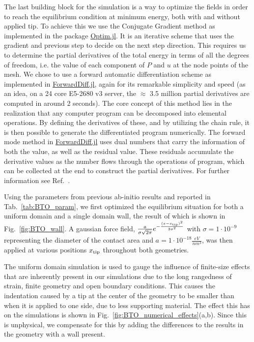 The last building block for the simulation is a way to optimize the fields in order to reach the equilibrium condition at minimum energy, both with and without applied tip.
To achieve this we use the Conjugate Gradient method \cite{Hestenes1952,Hager2005} as implemented in the package \href{https://github.com/JuliaNLSolvers/Optim.jl}{Optim.jl}.
It is an iterative scheme that uses the gradient and previous step to decide on the next step direction. 
This requires us to determine the partial derivatives of the total energy in terms of all the degrees of freedom, i.e. the value of each component of $P$ and $u$ at the node points of the mesh.
We chose to use a forward automatic differentiation scheme as implemented in \href{www.juliadiff.org/ForwardDiff.jl/latest/}{ForwardDiff.jl}, again for its remarkable simplicity and speed (as an idea, on a 24 core E5-2680 v3 server, the $\approx$ 3.5 million partial derivatives are computed in around 2 seconds).
The core concept of this method lies in the realization that any computer program can be decomposed into elemental operations. By defining the derivatives of these, and by utilizing the chain rule, it is then possible to generate the differentiated program numerically.
The forward mode method in \href{www.juliadiff.org/ForwardDiff.jl/latest/}{ForwardDiff.jl} uses dual numbers that carry the information of both the value, as well as the residual value. These residuals accumulate the derivative values as the number flows through the operations of program, which can be collected at the end to construct the partial derivatives.
For further information see Ref.~\cite{Hoffmann2016}.

Using the parameters from previous ab-initio results \cite{Marton2010} and reported in Tab.~\ref{tab:BTO_param}, we first optimized the equilibrium situation for both a uniform domain and a single domain wall, the result of which is shown in Fig.~\ref{fig:BTO_wall}.
A gaussian force field, $\frac{a}{\sigma \sqrt{2\pi}}e^{-\frac{(x-x_{\rm tip})^2}{2\sigma^2}}$ with $\sigma = 1 \cdot 10^{-9}$ representing the diameter of the contact area and $a = 1 \cdot 10^{-18} \frac{eV}{nm^3}$, was then applied at various positions $x_{\rm tip}$ throughout both geometries.

The uniform domain simulation is used to gauge the influence of finite-size effects that are inherently present in our simulations due to the long rangedness of strain, finite geometry and open boundary conditions.
This causes the indentation caused by a tip at the center of the geometry to be smaller than when it is applied to one side, due to less supporting material.
The effect this has on the simulations is shown in Fig.~\ref{fig:BTO_numerical_effects}(a,b).
Since this is unphysical, we compensate for this by adding the differences to the results in the geometry with a wall present.

